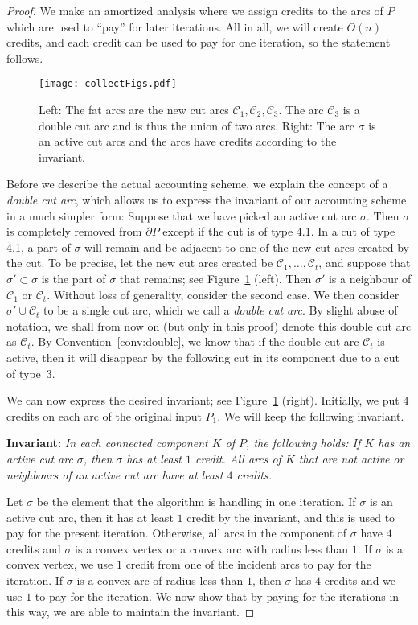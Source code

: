 \documentclass{article}
\newcommand{\PP}{P}
\newcommand{\KO}{K}
\newcommand{\se}{\sigma}
\newcommand{\cut}{\mathcal C}
\begin{document}
\begin{proof}
We make an amortized analysis where we assign credits to the arcs of $\PP$ which are used to ``pay'' for later iterations.
All in all, we will create $O(n)$ credits, and each credit can be used to pay for one iteration, so the statement follows.

\begin{figure}
\centering
\texttt{[image: collectFigs.pdf]}
\caption{Left: The fat arcs are the new cut arcs $\cut_1,\cut_2,\cut_3$. The arc $\cut_3$ is a double cut arc and is thus the union of two arcs.
Right: The arc $\se$ is an active cut arcs and the arcs have credits according to the invariant.}
\label{fig:doublecutarc}
\end{figure}

Before we describe the actual accounting scheme, we explain the concept of a \emph{double cut arc}, which allows us to express the invariant of our accounting scheme in a much simpler form:
Suppose that we have picked an active cut arc $\se$.
Then $\se$ is completely removed from $\partial\PP$ except if the cut is of type 4.1.
In a cut of type 4.1, a part of $\se$ will remain and be adjacent to one of the new cut arcs created by the cut.
To be precise, let the new cut arcs created be $\cut_1,\ldots,\cut_t$, and suppose that $\se'\subset \se$ is the part of $\se$ that remains; see Figure~\ref{fig:doublecutarc} (left).
Then $\se'$ is a neighbour of $\cut_1$ or $\cut_t$.
Without loss of generality, consider the second case.
We then consider $\se'\cup\cut_t$ to be a single cut arc, which we call a \emph{double cut arc}.
By slight abuse of notation, we shall from now on (but only in this proof) denote this double cut arc as $\cut_t$.
By Convention~\ref{conv:double}, we know that if the double cut arc $\cut_t$ is active, then it will disappear by the following cut in its component due to a cut of type~3.

We can now express the desired invariant; see Figure~\ref{fig:doublecutarc} (right).
Initially, we put $4$ credits on each arc of the original input $\PP_1$.
We will keep the following invariant. 

\textbf{Invariant:}
\emph{
In each connected component $\KO$ of $\PP$, the following holds:
If $\KO$ has an active cut arc $\se$, then $\se$ has at least $1$ credit.
All arcs of $\KO$ that are not active or neighbours of an active cut arc have at least $4$ credits.
}

Let $\se$ be the element 
that the algorithm is handling in one iteration.
If $\se$ is an active cut arc, then it has at least $1$ credit by the invariant, and this is used to pay for the present iteration.
Otherwise, all arcs in the component of $\se$ have $4$ credits and $\se$ is a convex vertex or a convex arc with radius less than $1$.
If $\se$ is a convex vertex, we use $1$ credit from one of the incident arcs to pay for the iteration.
If $\se$ is a convex arc of radius less than $1$, then $\se$ has $4$ credits and we use $1$ to pay for the iteration.
We now show that by paying for the iterations in this way, we are able to maintain the invariant.


\end{proof}
\end{document}
